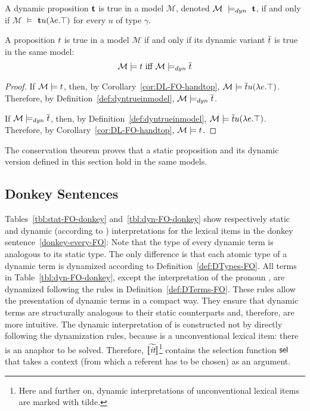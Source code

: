 \begin{definition} A dynamic proposition $\t2$ is true in a model $\mathcal{M}$, denoted
$\mathcal{M}~\models_{dyn}~\t2$, if and only if $\mathcal{M}$ $\models$ $\t2 u (\lambda e. \top)$ for every $u$ of type $\gamma$. \label{def:dyntrueinmodel}
\end{definition}

\begin{theorem}[Conservation] A proposition $\t1$ is true in a model $\mathcal{M}$  if and only if its dynamic variant $\tr{\t1}$ is true in the same model: 
 $$\mathcal{M} \models \t1 \ \text{iff} \ \mathcal{M} \models_{dyn} \tr{\t1}$$
 \label{th:conservation:FO}
\end{theorem}
\begin{proof}

If $\mathcal{M} \models \t1$, then, by Corollary~\ref{cor:DL-FO-handtop}, $\mathcal{M} \models \tr{\t1} \u1 (\lambda e.\top)$. Therefore, by Definition~\ref{def:dyntrueinmodel}, $\mathcal{M} \models_{dyn} \tr{\t1}$.

If $\mathcal{M} \models_{dyn} \tr{\t1}$, then, by Definition~\ref{def:dyntrueinmodel}, $\mathcal{M} \models \tr{\t1} \u1 (\lambda e.\top)$. Therefore, by Corollary~\ref{cor:DL-FO-handtop}, $\mathcal{M} \models \t1$.
\end{proof}

The conservation theorem proves that a static proposition and its dynamic version defined in this section hold in the same models.


\subsection{Donkey Sentences}

Tables~\ref{tbl:stat-FO-donkey} and~\ref{tbl:dyn-FO-donkey} show respectively static and dynamic (according to {\GN}) interpretations for the lexical items in the donkey sentence~\eqref{donkey-every-FO}:
Note that the type of every dynamic term is analogous to its static type. The only difference is that each atomic type of a dynamic term is dynamized according to Definition~\ref{def:DTypes-FO}. All terms in Table~\ref{tbl:dyn-FO-donkey}, except the interpretation of the pronoun , are dynamized following the rules in Definition~\ref{def:DTerms-FO}. These rules allow the presentation of dynamic terms in a compact way. They ensure that dynamic terms are structurally analogous to their static counterparts and, therefore, are more intuitive. The dynamic interpretation of  is constructed not by directly following the dynamization rules, because  is a unconventional lexical item: there is an anaphor to be solved. Therefore, $\widetilde{[\![\textit{it}]\!]}$\footnote{Here and further on, dynamic interpretations of unconventional lexical items are marked with tilde.} contains the selection function $\mathsf{sel}$ that takes a context (from which a referent has to be chosen) as an argument.

